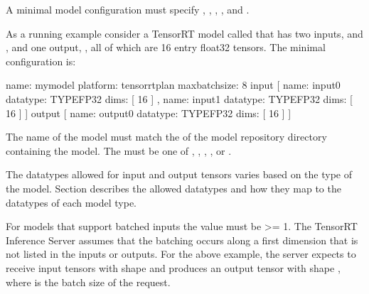\documentclass[letterpaper,10pt,english]{sphinxmanual}
\begin{document}
A minimal model configuration must specify , ,
,
, and
.

As a running example consider a TensorRT model called  that
has two inputs,  and , and one output, , all
of which are 16 entry float32 tensors. The minimal configuration is:

\begin{sphinxVerbatim}[commandchars=\\\{\}]
name: \PYGZdq{}mymodel\PYGZdq{}
platform: \PYGZdq{}tensorrt\PYGZus{}plan\PYGZdq{}
max\PYGZus{}batch\PYGZus{}size: 8
input [
  \PYGZob{}
    name: \PYGZdq{}input0\PYGZdq{}
    data\PYGZus{}type: TYPE\PYGZus{}FP32
    dims: [ 16 ]
  \PYGZcb{},
  \PYGZob{}
    name: \PYGZdq{}input1\PYGZdq{}
    data\PYGZus{}type: TYPE\PYGZus{}FP32
    dims: [ 16 ]
  \PYGZcb{}
]
output [
  \PYGZob{}
    name: \PYGZdq{}output0\PYGZdq{}
    data\PYGZus{}type: TYPE\PYGZus{}FP32
    dims: [ 16 ]
  \PYGZcb{}
]
\end{sphinxVerbatim}

The name of the model must match the  of the model repository
directory containing the model. The  must be one of
, , ,
, or .

The datatypes allowed for input and output tensors varies based on the
type of the model. Section {\hyperref[\detokenize{model_configuration:section-datatypes}]{}} describes the
allowed datatypes and how they map to the datatypes of each model
type.

For models that support batched inputs the  value must be
\textgreater{}= 1. The TensorRT Inference Server assumes that the batching occurs
along a first dimension that is not listed in the inputs or
outputs. For the above example, the server expects to receive input
tensors with shape \sphinxstylestrong{{[} x, 16 {]}} and produces an output tensor with
shape \sphinxstylestrong{{[} x, 16 {]}}, where  is the batch size of the request.
\end{document}
